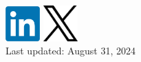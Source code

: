 \documentclass[A4,11pt]{article}
\begin{document}
\begin{minipage}[c]{0.4\textwidth}
    \href{https://www.linkedin.com/in/hafez-ghaemi-618b8287/}{\includegraphics[width=0.1\textwidth]{linkedin}}
    \href{https://x.com/hafezghm}{\includegraphics[width=0.1\textwidth]{x}}\\
    Last updated: August 31, 2024
\end{minipage}

\end{document}
